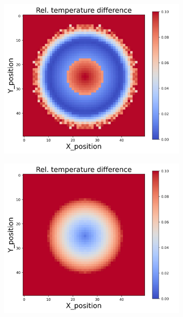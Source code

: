 {\begin{figure}[h]
\begin{minipage}{\textwidth}
\begin{subfigure}{0.27\textwidth}
        \end{subfigure}
    \end{minipage}\\
    \begin{minipage}{\textwidth}
        \centering
        \begin{subfigure}{0.27\textwidth}
            \centering
            \includegraphics[width=\textwidth]{figures/raw_data/25/lin_square/T_bias.jpg}
        \end{subfigure}
        \begin{subfigure}{0.27\textwidth}
            \centering
            \includegraphics[width=\textwidth]{figures/raw_data/26/lin_square/T_bias.jpg}

\end{subfigure}
\end{minipage}
\end{figure}}
